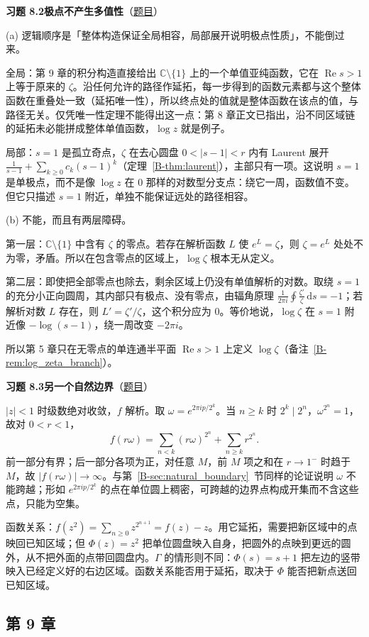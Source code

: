 \documentclass[11pt,a4paper]{article}
\newcommand{\CC}{\mathbb{C}}
\newcommand{\dd}{\,\mathrm{d}}
\renewcommand{\Re}{\operatorname{Re}}
\newcommand{\bref}[1]{\ref*{B-#1}}
\newcommand{\Sol}[2]{%
  \par\addvspace{1.2em}\noindent
  \hypertarget{s:#1}{}\textbf{习题 #1\quad #2}\hfill{\small（\hyperlink{q:#1}{题目}）}\par
  \nopagebreak\smallskip}
\begin{document}
\Sol{8.2}{极点不产生多值性}
(a) 逻辑顺序是「整体构造保证全局相容，局部展开说明极点性质」，不能倒过来。

全局：第 9 章的积分构造直接给出 $\CC\setminus\{1\}$ 上的一个单值亚纯函数，它在 $\Re s>1$ 上等于原来的 $\zeta$。沿任何允许的路径作延拓，每一步得到的函数元素都与这个整体函数在重叠处一致（延拓唯一性），所以终点处的值就是整体函数在该点的值，与路径无关。仅凭唯一性定理不能得出这一点：第 8 章正文已指出，沿不同区域链的延拓未必能拼成整体单值函数，$\log z$ 就是例子。

局部：$s=1$ 是孤立奇点，$\zeta$ 在去心圆盘 $0<|s-1|<r$ 内有 Laurent 展开 $\frac1{s-1}+\sum_{k\ge0}c_k(s-1)^k$（定理~\bref{thm:laurent}），主部只有一项。这说明 $s=1$ 是单极点，而不是像 $\log z$ 在 $0$ 那样的对数型分支点：绕它一周，函数值不变。但它只描述 $s=1$ 附近，单独不能保证远处的路径相容。

(b) 不能，而且有两层障碍。

第一层：$\CC\setminus\{1\}$ 中含有 $\zeta$ 的零点。若存在解析函数 $L$ 使 $e^L=\zeta$，则 $\zeta=e^L$ 处处不为零，矛盾。所以在包含零点的区域上，$\log\zeta$ 根本无从定义。

第二层：即使把全部零点也除去，剩余区域上仍没有单值解析的对数。取绕 $s=1$ 的充分小正向圆周，其内部只有极点、没有零点，由辐角原理 $\frac1{2\pi i}\oint\frac{\zeta'}{\zeta}\dd s=-1$；若解析对数 $L$ 存在，则 $L'=\zeta'/\zeta$，这个积分应为 $0$。等价地说，$\log\zeta$ 在 $s=1$ 附近像 $-\log(s-1)$，绕一周改变 $-2\pi i$。

所以第 5 章只在无零点的单连通半平面 $\Re s>1$ 上定义 $\log\zeta$（备注~\bref{rem:log_zeta_branch}）。

\Sol{8.3}{另一个自然边界}
$|z|<1$ 时级数绝对收敛，$f$ 解析。取 $\omega=e^{2\pi ip/2^k}$。当 $n\ge k$ 时 $2^k\mid2^n$，$\omega^{2^n}=1$，故对 $0<r<1$，
\[
  f(r\omega)=\sum_{n<k}(r\omega)^{2^n}+\sum_{n\ge k}r^{2^n}.
\]
前一部分有界；后一部分各项为正，对任意 $M$，前 $M$ 项之和在 $r\to1^-$ 时趋于 $M$，故 $|f(r\omega)|\to\infty$。与第~\bref{sec:natural_boundary}~节同样的论证说明 $\omega$ 不能跨越；形如 $e^{2\pi ip/2^k}$ 的点在单位圆上稠密，可跨越的边界点构成开集而不含这些点，只能为空集。

函数关系：$f(z^2)=\sum_{n\ge0}z^{2^{n+1}}=f(z)-z$。用它延拓，需要把新区域中的点映回已知区域；但 $\Phi(z)=z^2$ 把单位圆盘映入自身，把圆外的点映到更远的圆外，从不把外面的点带回圆盘内。$\Gamma$ 的情形则不同：$\Phi(s)=s+1$ 把左边的竖带映入已经定义好的右边区域。函数关系能否用于延拓，取决于 $\Phi$ 能否把新点送回已知区域。

\subsection*{第 9 章}
\end{document}
